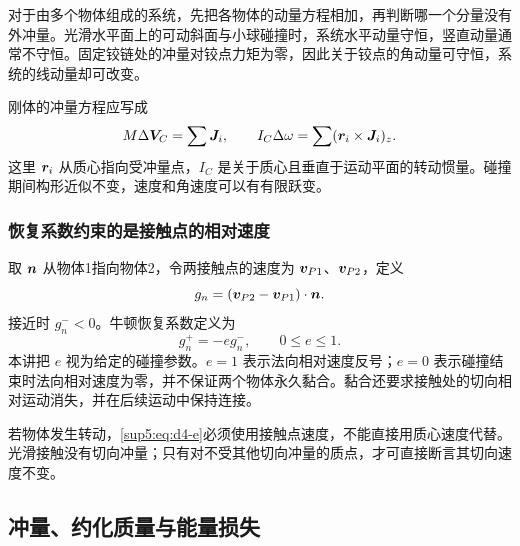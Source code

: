对于由多个物体组成的系统，先把各物体的动量方程相加，再判断哪一个分量没有外冲量。光滑水平面上的可动斜面与小球碰撞时，系统水平动量守恒，竖直动量通常不守恒。固定铰链处的冲量对铰点力矩为零，因此关于铰点的角动量可守恒，系统的线动量却可改变。

刚体的冲量方程应写成
\begin{equation}\label{sup5:eq:d4-rigid}
 M\Delta\bm{V}_C=\sum\bm{J}_i,\qquad
 I_C\Delta\omega=\sum(\bm{r}_i\times\bm{J}_i)_z.
\end{equation}
这里 $\bm{r}_i$ 从质心指向受冲量点，$I_C$ 是关于质心且垂直于运动平面的转动惯量。碰撞期间构形近似不变，速度和角速度可以有有限跃变。

\subsubsection{恢复系数约束的是接触点的相对速度}
取 $\bm{n}$ 从物体1指向物体2，令两接触点的速度为 $\bm{v}_{P1}$、$\bm{v}_{P2}$，定义
\begin{equation}
 g_n=(\bm{v}_{P2}-\bm{v}_{P1})\cdot\bm{n}.
\end{equation}
接近时 $g_n^-<0$。牛顿恢复系数定义为
\begin{equation}\label{sup5:eq:d4-e}
 g_n^+=-e g_n^-,\qquad 0\le e\le1.
\end{equation}
本讲把 $e$ 视为给定的碰撞参数。$e=1$ 表示法向相对速度反号；$e=0$ 表示碰撞结束时法向相对速度为零，并不保证两个物体永久黏合。黏合还要求接触处的切向相对运动消失，并在后续运动中保持连接。

若物体发生转动，\eqref{sup5:eq:d4-e}必须使用接触点速度，不能直接用质心速度代替。光滑接触没有切向冲量；只有对不受其他切向冲量的质点，才可直接断言其切向速度不变。


\subsection{冲量、约化质量与能量损失}
